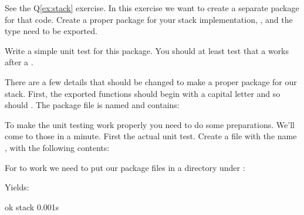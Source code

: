\begin{Exercise}[title={Stack as package},difficulty=2]
\label{ex:stack-package}
\Question\label{ex:stack-package q1} 
See the Q\ref{ex:stack} exercise. In this exercise we want to create
a separate package for that code.
Create a proper package for your
stack implementation, ,  and the  type need to be
exported.

\Question\label{ex:stack-package q2} Write a simple unit test for this package.
You should at least test that a  works after a .

\end{Exercise}

\begin{Answer}
\Question There are a few details that should be changed to make a proper package
for our stack. First, the exported functions should begin with a capital 
letter and so should . The package file is named 
and contains:


\Question To make the unit testing work properly you need to do some
preparations. We'll come to those in a minute. First the actual unit test.
Create a file with the name , with the following contents:


For  to work we need to put our package files in a directory
under :\\

\begin{display}
\pr {}
\pr {}
\pr {}
\end{display}

Yields:\\

\begin{display}
\pr {}
ok      stack   0.001s
\end{display}

\end{Answer}
